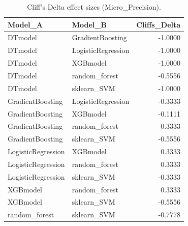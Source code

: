\begin{table}[t]
\centering
\begin{tabular}{llr}
\toprule
Model_A & Model_B & Cliffs_Delta \\
\midrule
DTmodel & GradientBoosting & -1.0000 \\
DTmodel & LogisticRegression & -1.0000 \\
DTmodel & XGBmodel & -1.0000 \\
DTmodel & random_forest & -0.5556 \\
DTmodel & sklearn_SVM & -1.0000 \\
GradientBoosting & LogisticRegression & -0.3333 \\
GradientBoosting & XGBmodel & -0.1111 \\
GradientBoosting & random_forest & 0.3333 \\
GradientBoosting & sklearn_SVM & -0.5556 \\
LogisticRegression & XGBmodel & 0.3333 \\
LogisticRegression & random_forest & 0.3333 \\
LogisticRegression & sklearn_SVM & -0.3333 \\
XGBmodel & random_forest & 0.3333 \\
XGBmodel & sklearn_SVM & -0.5556 \\
random_forest & sklearn_SVM & -0.7778 \\
\bottomrule
\end{tabular}
\caption{Cliff's Delta effect sizes (Micro_Precision).}
\label{tab:cliffs_Micro_Precision}
\end{table}